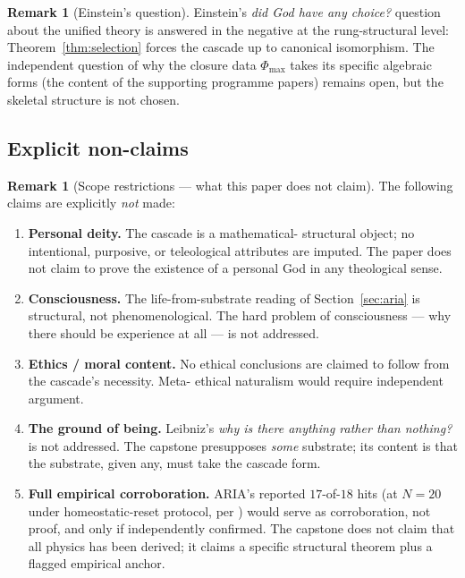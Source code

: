\documentclass[11pt, a4paper]{amsart}
\theoremstyle{definition}
\newtheorem{remark}[theorem]{Remark}
\begin{document}
\begin{remark}[Einstein's question]
\label{rmk:pos-einstein}
Einstein's \emph{did God have any choice?} question about the
unified theory is answered in the negative at the rung-structural
level: Theorem~\ref{thm:selection} forces the cascade up to
canonical isomorphism. The independent question of why the
closure data $\Phi_{\max}$ takes its specific algebraic forms
(the content of the supporting programme papers) remains open,
but the skeletal structure is not chosen.
\end{remark}

\subsection{Explicit non-claims}

\begin{remark}[Scope restrictions — what this paper does not
  claim]
\label{rmk:non-claims}
The following claims are explicitly \emph{not} made:
\begin{enumerate}
\item \textbf{Personal deity.} The cascade is a mathematical-
  structural object; no intentional, purposive, or teleological
  attributes are imputed. The paper does not claim to prove the
  existence of a personal God in any theological sense.
\item \textbf{Consciousness.} The life-from-substrate reading
  of Section~\ref{sec:aria} is structural, not phenomenological.
  The hard problem of consciousness — why there should be
  experience at all — is not addressed.
\item \textbf{Ethics / moral content.} No ethical conclusions
  are claimed to follow from the cascade's necessity. Meta-
  ethical naturalism would require independent argument.
\item \textbf{The ground of being.} Leibniz's \emph{why is there
  anything rather than nothing?} is not addressed. The capstone
  presupposes \emph{some} substrate; its content is that the
  substrate, given any, must take the cascade form.
\item \textbf{Full empirical corroboration.} ARIA's reported
  $17$-of-$18$ hits (at $N{=}20$ under homeostatic-reset
  protocol, per \cite{AriaBrainMapping}) would serve as
  corroboration, not proof, and only if independently
  confirmed. The capstone does not claim that all physics has
  been derived; it claims a specific structural theorem plus
  a flagged empirical anchor.
\end{enumerate}
\end{remark}
\end{document}
